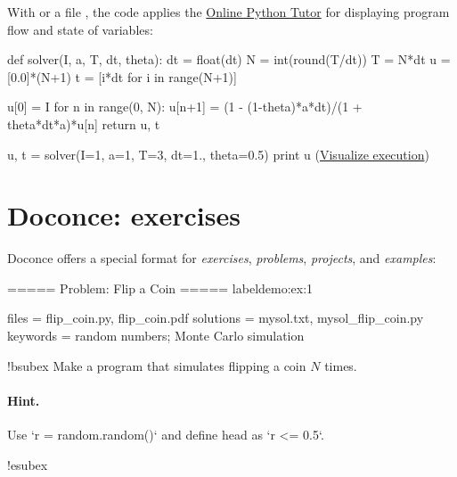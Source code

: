 \documentclass[%
oneside,                 %
final,                   %
chapterprefix=true,      %
open=right               %
10pt]{book}
\begin{document}
With  or a file , the code applies the
\href{{http://pythontutor.com}}{Online Python Tutor} for displaying
program flow and state of variables:

\bpypro
def solver(I, a, T, dt, theta):
    dt = float(dt)
    N = int(round(T/dt))
    T = N*dt
    u = [0.0]*(N+1)
    t = [i*dt for i in range(N+1)]

    u[0] = I
    for n in range(0, N):
        u[n+1] = (1 - (1-theta)*a*dt)/(1 + theta*dt*a)*u[n]
    return u, t

u, t = solver(I=1, a=1, T=3, dt=1., theta=0.5)
print u
\epypro
\noindent
(\href{{http://pythontutor.com/visualize.html\#code=def+solver\%28I\%2C+a\%2C+T\%2C+dt\%2C+theta\%29\%3A\%0A++++dt+\%3D+float\%28dt\%29\%0A++++N+\%3D+int\%28round\%28T\%2Fdt\%29\%29\%0A++++T+\%3D+N\%2Adt\%0A++++u+\%3D+\%5B0.0\%5D\%2A\%28N\%2B1\%29\%0A++++t+\%3D+\%5Bi\%2Adt+for+i+in+range\%28N\%2B1\%29\%5D\%0A\%0A++++u\%5B0\%5D+\%3D+I\%0A++++for+n+in+range\%280\%2C+N\%29\%3A\%0A++++++++u\%5Bn\%2B1\%5D+\%3D+\%281+-+\%281-theta\%29\%2Aa\%2Adt\%29\%2F\%281+\%2B+theta\%2Adt\%2Aa\%29\%2Au\%5Bn\%5D\%0A++++return+u\%2C+t\%0A\%0Au\%2C+t+\%3D+solver\%28I\%3D1\%2C+a\%3D1\%2C+T\%3D3\%2C+dt\%3D1.\%2C+theta\%3D0.5\%29\%0Aprint+u&mode=display&cumulative=false&heapPrimitives=false&drawParentPointers=false&textReferences=false&py=2&curInstr=0}}{Visualize execution}) 





\section{Doconce: exercises}

Doconce offers a special format for \emph{exercises}, \emph{problems}, \emph{projects},
and \emph{examples}:

\bccq
===== Problem: Flip a Coin =====
label{demo:ex:1}

files = flip_coin.py, flip_coin.pdf
solutions = mysol.txt, mysol_flip_coin.py
keywords = random numbers; Monte Carlo simulation

!bsubex
Make a program that simulates flipping a coin $N$ times.

\paragraph{Hint.}\n
Use `r = random.random()` and define head as `r <= 0.5`.

!esubex
\end{document}
